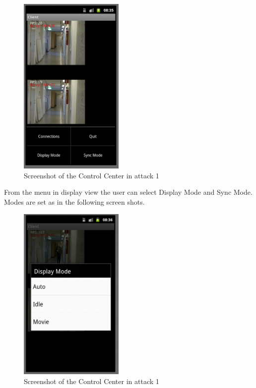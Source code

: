 \documentclass[8pt,titlepage]{article}
\begin{document}
\begin{figure}[hbp]
\includegraphics[width=0.45\textwidth]{../screenshots/androidDisplaying.png}
\caption{Screenshot of the Control Center in attack 1}
\end{figure}

From the menu in display view the user can select Display Mode and Sync Mode. Modes are set as in the following screen shots.

\begin{figure}[hbp]
\includegraphics[width=0.45\textwidth]{../screenshots/androidDisplayMode.png}
\caption{Screenshot of the Control Center in attack 1}
\end{figure}
\end{document}
